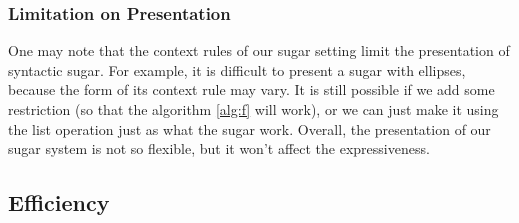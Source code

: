 \subsubsection{Limitation on Presentation}
One may note that the context rules of our sugar setting limit the presentation of syntactic sugar. For example, it is difficult to present a sugar with ellipses, because the form of its context rule may vary. It is still possible if we add some 
restriction (so that the algorithm \ref{alg:f} will work), or we can just make it using the list operation just as what the sugar  work. Overall, the presentation of our sugar system is not so flexible, but it won't affect the expressiveness.

\subsection{Efficiency}

